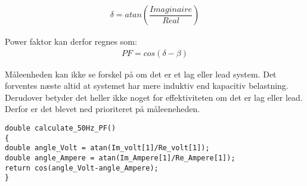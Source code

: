 \begin{align}
\delta = atan(\dfrac{Imaginaire}{Real})
\end{align}

Power faktor kan derfor regnes som:
\begin{align}
PF = cos(\delta - \beta)
\end{align}

Måleenheden kan ikke se forskel på om det er et lag eller lead system. Det forventes næste altid at systemet har mere induktiv end kapacitiv belastning. Derudover betyder det heller ikke noget for effektiviteten om det er lag eller lead. Derfor er det blevet ned prioriteret på måleeneheden.

\begin{lstlisting}
double calculate_50Hz_PF()
{
double angle_Volt = atan(Im_volt[1]/Re_volt[1]);
double angle_Ampere = atan(Im_Ampere[1]/Re_Ampere[1]);    
return cos(angle_Volt-angle_Ampere);
}
\end{lstlisting}
 
    

  
